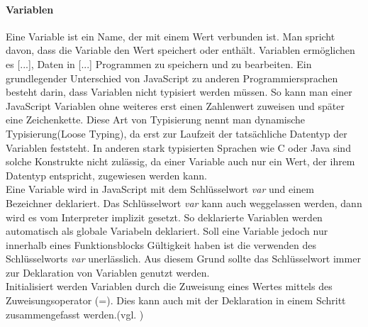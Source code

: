 \documentclass[12pt,a4paper,bibliography=totocnumbered,listof=totocnumbered]{scrartcl}
\begin{document}
\paragraph{Variablen} \glqq Eine Variable ist ein Name, der mit einem Wert verbunden ist. Man spricht davon, dass die Variable den Wert speichert oder enthält. Variablen ermöglichen es [...], Daten in [...] Programmen zu speichern und zu bearbeiten.\grqq{}\cite[S.51]{FlanJava2007} Ein grundlegender Unterschied von JavaScript zu anderen Programmiersprachen besteht darin, dass Variablen nicht typisiert werden müssen. So kann man einer JavaScript Variablen ohne weiteres erst einen Zahlenwert zuweisen und später eine Zeichenkette. Diese Art von Typisierung nennt man dynamische Typisierung(Loose Typing), da erst zur Laufzeit der tatsächliche Datentyp der Variablen feststeht. In anderen stark typisierten Sprachen wie C oder Java sind solche Konstrukte nicht zulässig, da einer Variable auch nur ein Wert, der ihrem Datentyp entspricht, zugewiesen werden kann.\\Eine Variable wird in JavaScript mit dem Schlüsselwort \textit{var} und einem Bezeichner deklariert. Das Schlüsselwort \textit{var} kann auch weggelassen werden, dann wird es vom Interpreter implizit gesetzt. So deklarierte Variablen werden automatisch als globale Variabeln deklariert. Soll eine Variable jedoch nur innerhalb eines Funktionsblocks Gültigkeit haben ist die verwenden des Schlüsselworts \textit{var} unerlässlich. Aus diesem Grund sollte das Schlüsselwort immer zur Deklaration von Variablen genutzt werden.\\Initialisiert werden Variablen durch die Zuweisung eines Wertes mittels des Zuweisungsoperator (=). Dies kann auch mit der Deklaration in einem Schritt zusammengefasst werden.(vgl. \cite[S.52ff]{FlanJava2007})
\end{document}
